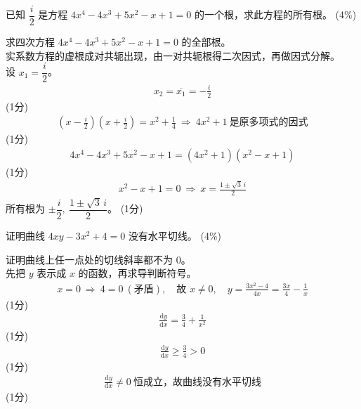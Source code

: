 \begin{question}[points = 4]
    已知 $\dfrac{i}{2}$ 是方程 $4x^4-4x^3+5x^2-x+1=0$ 的一个根，求此方程的所有根。
    \hfill (4\%)
\end{question}

\begin{solution}
    求四次方程 $4x^4-4x^3+5x^2-x+1=0$ 的全部根。\\
    实系数方程的虚根成对共轭出现，由一对共轭根得二次因式，再做因式分解。\\
    设 $x_1=\dfrac i2$。\\
    \begin{align*}
        x_2=\overline{x_1}=-\frac i2
    \end{align*}
    \hfill (1分) \\
    \begin{align*}
        \left(x-\frac i2\right)\left(x+\frac i2\right)=x^2+\frac14
        \ \Rightarrow\ 4x^2+1\ \text{是原多项式的因式}
    \end{align*}
    \hfill (1分) \\
    \begin{align*}
        4x^4-4x^3+5x^2-x+1=(4x^2+1)(x^2-x+1)
    \end{align*}
    \hfill (1分) \\
    \begin{align*}
        x^2-x+1=0\ \Rightarrow\ x=\frac{1\pm\sqrt3\,i}{2}
    \end{align*}
    所有根为 $\pm\dfrac i2,\ \dfrac{1\pm\sqrt3\,i}{2}$。 \hfill (1分)
\end{solution}

\begin{question}[points = 4]
    证明曲线 $4xy-3x^2+4=0$ 没有水平切线。
    \hfill (4\%)
\end{question}

\begin{solution}
    证明曲线上任一点处的切线斜率都不为 $0$。\\
    先把 $y$ 表示成 $x$ 的函数，再求导判断符号。\\
    \begin{align*}
        x=0\ \Rightarrow\ 4=0\ (\text{矛盾}),\quad\text{故 }x\neq0,\quad
        y=\frac{3x^2-4}{4x}=\frac{3x}{4}-\frac1x
    \end{align*}
    \hfill (1分) \\
    \begin{align*}
        \frac{\mathrm{d}y}{\mathrm{d}x}=\frac34+\frac1{x^2}
    \end{align*}
    \hfill (1分) \\
    \begin{align*}
        \frac{\mathrm{d}y}{\mathrm{d}x}\ge\frac34>0
    \end{align*}
    \hfill (1分) \\
    \begin{align*}
        \frac{\mathrm{d}y}{\mathrm{d}x}\neq0\ \text{恒成立，故曲线没有水平切线}
    \end{align*}
    \hfill (1分)
\end{solution}

